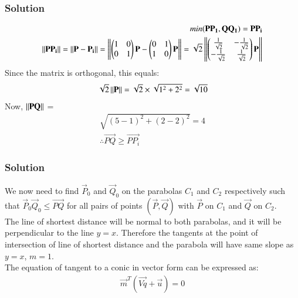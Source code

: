 \documentclass{beamer}
\begin{document}
\begin{frame}[fragile]
    \frametitle{Solution}
\begin{align} min(\mathbf{PP_1}, \mathbf{QQ_1}) = \mathbf{PP_i}\\
\left\lVert\mathbf{PP_i}\right\rVert = \left\lVert\mathbf{P} - \mathbf{P_i} \right\rVert= \left\lVert\begin{pmatrix}1&0\\0&1\end{pmatrix}\mathbf{P} - \begin{pmatrix}0&1\\1&0\end{pmatrix}\mathbf{P}\right\rVert =
\sqrt{2}\left\lVert\begin{pmatrix}\frac{1}{\sqrt{2}} &-\frac{1}{\sqrt{2}} \\ -\frac{1}{\sqrt{2}} & \frac{1}{\sqrt{2}}\end{pmatrix}\mathbf{P}\right\rVert
\end{align}
Since the matrix is orthogonal, this equals:
\begin{align}
\sqrt{2}\left\lVert\mathbf{P}\right\rVert = \sqrt{2}\times \sqrt{1^2 + 2^2} = \sqrt{10}
\end{align}
Now, $\left\lVert\mathbf{PQ}\right\rVert$ = 
\begin{align}
    \sqrt{(5-1)^2 + (2-2)^2} = 4\\
\therefore \vec{PQ} \geq \vec{PP_i}\end{align}
\end{frame}

\begin{frame}[fragile]
    \frametitle{Solution}
We now need to find $\vec{P}_0$ and $\vec{Q}_0$ on the parabolas $C_1$ and $C_2$ respectively such that $\vec{P}_0\vec{Q}_0 \leq \vec{PQ}$ for all pairs of points $(\vec{P}, \vec{Q})$
with $\vec{P}$ on $C_1$ and $\vec{Q}$ on $C_2$. \vspace{1cm}\\
The line of shortest distance will be normal to both parabolas, and it will be perpendicular to the line $y=x$. Therefore the tangents at the point of intersection of line of shortest distance and the parabola will have same slope as $y=x$, $m=1$.\vspace{1cm}\\
The equation of tangent to a conic in vector form can be expressed as:
\begin{align}
    \vec{m}^T(\vec{Vq} + \vec{u}) =0
\end{align}
\end{frame}
\end{document}
